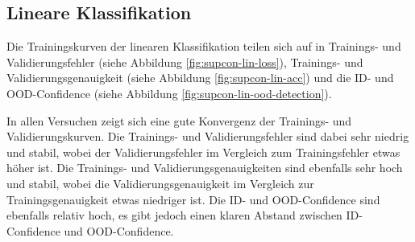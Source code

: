 \subsection{Lineare Klassifikation} \label{sec:supcon-lin-results}

Die Trainingskurven der linearen Klassifikation teilen sich auf in Trainings- und Validierungsfehler (siehe Abbildung \ref{fig:supcon-lin-loss}), Trainings- und Validierungsgenauigkeit (siehe Abbildung \ref{fig:supcon-lin-acc}) und die ID- und OOD-Confidence (siehe Abbildung \ref{fig:supcon-lin-ood-detection}).

In allen Versuchen zeigt sich eine gute Konvergenz der Trainings- und Validierungskurven. Die Trainings- und Validierungsfehler sind dabei sehr niedrig und stabil, wobei der Validierungsfehler im Vergleich zum Trainingsfehler etwas höher ist. Die Trainings- und Validierungsgenauigkeiten sind ebenfalls sehr hoch und stabil, wobei die Validierungsgenauigkeit im Vergleich zur Trainingsgenauigkeit etwas niedriger ist. Die ID- und OOD-Confidence sind ebenfalls relativ hoch, es gibt jedoch einen klaren Abstand zwischen ID-Confidence und OOD-Confidence.

